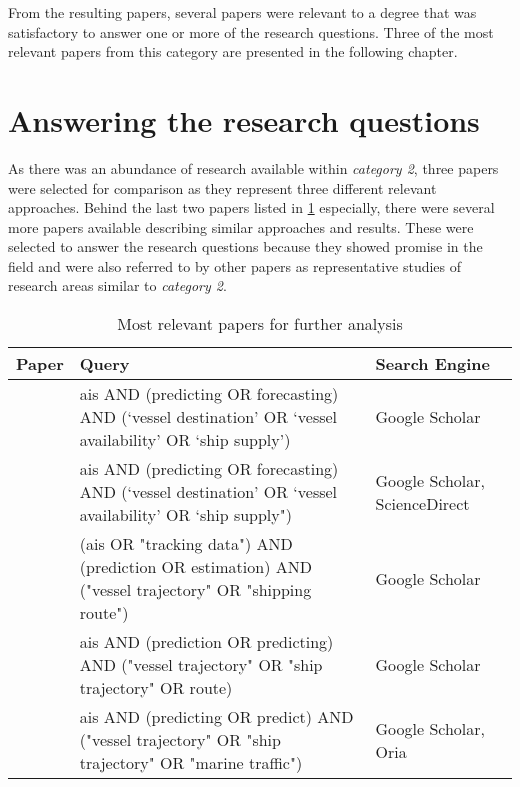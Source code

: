 From the resulting papers, several papers were relevant to a degree that was satisfactory to answer one or more of the research questions. Three of the most relevant papers from this category are presented in the following chapter.

\section{Answering the research questions}

As there was an abundance of research available within \textit{category 2}, three papers were selected for comparison as they represent three different relevant approaches. Behind the last two papers listed in \cref{tab:relevant_papers} especially, there were several more papers available describing similar approaches and results. These were selected to answer the research questions because they showed promise in the field and were also referred to by other papers as representative studies of research areas similar to \textit{category 2}.

\begin{table}
    \centering
    \begin{tabular}{p{1in} p{2.5in} p{1in}}
        \toprule
        \textbf{Paper} & \textbf{Query} & \textbf{Search Engine} \\
        \midrule
        \cite{lechtenberg2019} & ais AND (predicting OR forecasting) AND (`vessel destination' OR `vessel availability' OR `ship supply') & Google Scholar \\
        \midrule
        \cite{Zhang2020AISApproach} & ais AND (predicting OR forecasting) AND (`vessel destination' OR `vessel availability' OR `ship supply") & Google Scholar, ScienceDirect \\
        \midrule
        \cite{Pelizzari2016GeneticAF} & (ais OR "tracking data") AND (prediction OR estimation) AND ("vessel trajectory" OR "shipping route") & Google Scholar \\
        \midrule
        \cite{pallotta} & ais AND (prediction OR predicting) AND ("vessel trajectory" OR "ship trajectory" OR route) & Google Scholar \\
        \midrule
        \cite{Daranda2016NeuralNA} & ais AND (predicting OR predict) AND ("vessel trajectory" OR "ship trajectory" OR "marine traffic") & Google Scholar, Oria \\
        \bottomrule
    \end{tabular}
    \caption{Most relevant papers for further analysis}
    \label{tab:relevant_papers}
\end{table}

